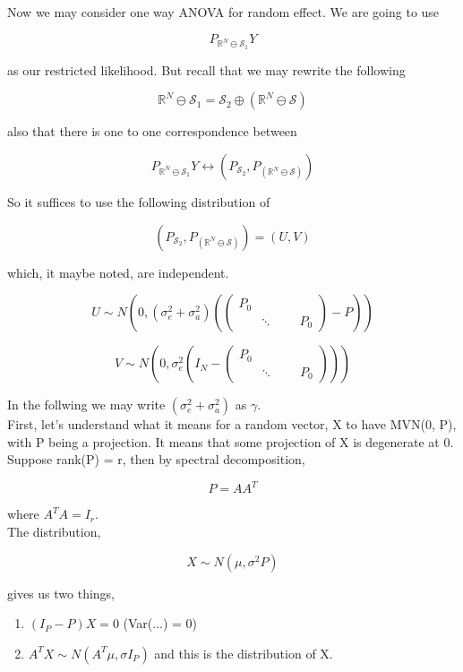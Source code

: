 \documentclass[11pt,fleqn]{book} %
\begin{document}
Now we may consider one way ANOVA for random effect. We are going to use

		$$  P_{\mathbb{R}^N \ominus \mathcal{S}_1} Y$$

as our restricted likelihood. But recall that we may rewrite the following


		$$ \mathbb{R}^N \ominus \mathcal{S}_1 = \mathcal{S}_2 \oplus (\mathbb{R}^N \ominus \mathcal{S})$$

also that there is one to one correspondence between

		$$P_{\mathbb{R}^N \ominus \mathcal{S}_1} Y \leftrightarrow \left( P_{\mathcal{S}_2},  P_{(\mathbb{R}^N \ominus \mathcal{S})} \right)$$

So it suffices to use the following distribution of 

		$$\left( P_{\mathcal{S}_2},  P_{(\mathbb{R}^N \ominus \mathcal{S})} \right) = (U, V) $$

which, it maybe noted, are independent. 


		$$ U \sim N \left( 0 , (\sigma_e^2 + \sigma_a^2) ( \begin{pmatrix}
			P_0 & & \\
			& \ddots & 
			& & P_0
		\end{pmatrix}- P)\right)$$


		$$V \sim N \left( 0 , \sigma_e^2 ( I_N -  \begin{pmatrix}
			P_0 & & \\
			& \ddots & 
			& & P_0
		\end{pmatrix})\right) $$

In the follwing we may write $(\sigma_e^2 + \sigma_a^2)$ as $\gamma$. \\

First, let's understand what it means for a random vector, X to have MVN(0, P), with P being a projection. It means that some projection of X is degenerate at 0. \\


Suppose rank(P) = r, then by spectral decomposition, 

		$$P = AA^T $$


where $A^T A = I_r$. \\

The distribution, 

			$$ X \sim N(\mu, \sigma^2 P) $$

gives us two things, 

		\begin{enumerate}
			\item $(I_P - P)X = 0$ (Var(...) = 0)
			\item $A^T X \sim N(A^T\mu, \sigma I_P)$ and this is the distribution of X. 
		\end{enumerate}
\end{document}
